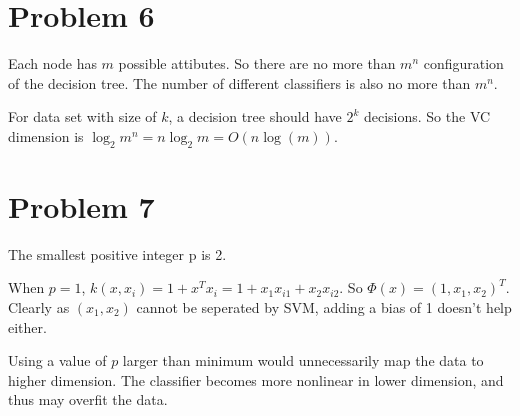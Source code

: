 \documentclass[10pt]{article}
\begin{document}
\section*{Problem 6}

Each node has $m$ possible attibutes. So there are no more than
$m^n$ configuration of the decision tree. The number of different
classifiers is also no more than $m^n$.

For data set with size of $k$, a decision tree should have $2^k$
decisions. So the VC dimension is $\log_2{m^n} = n \log_2{m} = O(n
\log(m))$.

\section*{Problem 7}

The smallest positive integer p is 2.

When $p = 1$, $k(x, x_i) = 1 + x^T x_i = 1 + x_1 x_{i1} + x_2 x_{i2}$.
So $\Phi(x) = (1, x_1, x_2)^T$. Clearly as $(x_1, x_2)$ cannot be
seperated by SVM, adding a bias of 1 doesn't help either.

Using a value of $p$ larger than minimum would unnecessarily map the
data to higher dimension. The classifier becomes more nonlinear in
lower dimension, and thus may overfit the data.
\end{document}
